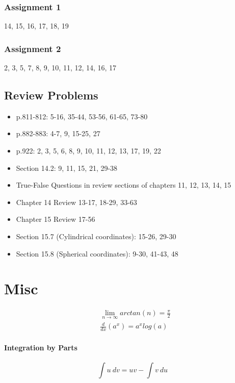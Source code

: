 \documentclass[12 pt]{article}
\theoremstyle{definition}
\begin{document}
\subsubsection{Assignment 1} 14, 15, 16, 17, 18, 19
\subsubsection{Assignment 2} 2, 3, 5, 7, 8, 9, 10, 11, 12, 14, 16, 17
\subsection{Review Problems}
\begin{itemize}
	\item p.811-812: 5-16, 35-44, 53-56, 61-65, 73-80
	\item p.882-883: 4-7, 9, 15-25, 27
	\item p.922: 2, 3, 5, 6, 8, 9, 10, 11, 12, 13, 17, 19, 22
	\item Section 14.2: 9, 11, 15, 21, 29-38
        \item True-False Questions in review sections of chapters 11, 12, 13, 14, 15
        \item Chapter 14 Review 13-17, 18-29, 33-63
        \item Chapter 15 Review 17-56
        \item Section 15.7 (Cylindrical coordinates): 15-26, 29-30
        \item Section 15.8 (Spherical coordinates): 9-30, 41-43, 48
\end{itemize}
\section{Misc}
\begin{align}
	& \lim_{n\to \infty}arctan(n)=\frac{\pi}{2}
	\\&\frac{d}{dx}\left(a^x\right)=a^x log(a)
\end{align}
\paragraph{Integration by Parts}
$$ \int u \ dv = uv - \int v \ du $$
\end{document}
